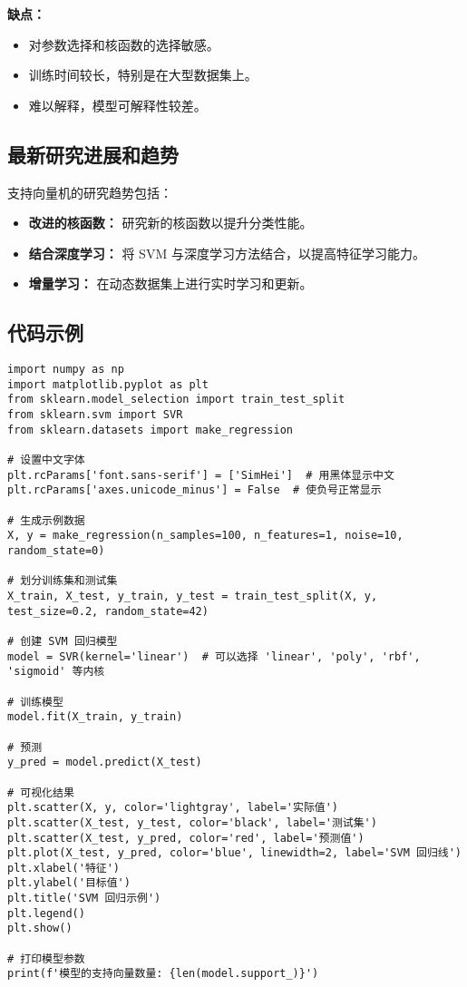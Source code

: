 \textbf{缺点：}
\begin{itemize}
    \item 对参数选择和核函数的选择敏感。
    \item 训练时间较长，特别是在大型数据集上。
    \item 难以解释，模型可解释性较差。
\end{itemize}

\subsection*{最新研究进展和趋势}
支持向量机的研究趋势包括：
\begin{itemize}
    \item \textbf{改进的核函数：} 研究新的核函数以提升分类性能。
    \item \textbf{结合深度学习：} 将 SVM 与深度学习方法结合，以提高特征学习能力。
    \item \textbf{增量学习：} 在动态数据集上进行实时学习和更新。
\end{itemize}
\subsection*{代码示例}
\begin{lstlisting}
import numpy as np
import matplotlib.pyplot as plt
from sklearn.model_selection import train_test_split
from sklearn.svm import SVR
from sklearn.datasets import make_regression

# 设置中文字体
plt.rcParams['font.sans-serif'] = ['SimHei']  # 用黑体显示中文
plt.rcParams['axes.unicode_minus'] = False  # 使负号正常显示

# 生成示例数据
X, y = make_regression(n_samples=100, n_features=1, noise=10, random_state=0)

# 划分训练集和测试集
X_train, X_test, y_train, y_test = train_test_split(X, y, test_size=0.2, random_state=42)

# 创建 SVM 回归模型
model = SVR(kernel='linear')  # 可以选择 'linear', 'poly', 'rbf', 'sigmoid' 等内核

# 训练模型
model.fit(X_train, y_train)

# 预测
y_pred = model.predict(X_test)

# 可视化结果
plt.scatter(X, y, color='lightgray', label='实际值')
plt.scatter(X_test, y_test, color='black', label='测试集')
plt.scatter(X_test, y_pred, color='red', label='预测值')
plt.plot(X_test, y_pred, color='blue', linewidth=2, label='SVM 回归线')
plt.xlabel('特征')
plt.ylabel('目标值')
plt.title('SVM 回归示例')
plt.legend()
plt.show()

# 打印模型参数
print(f'模型的支持向量数量: {len(model.support_)}')

\end{lstlisting}


